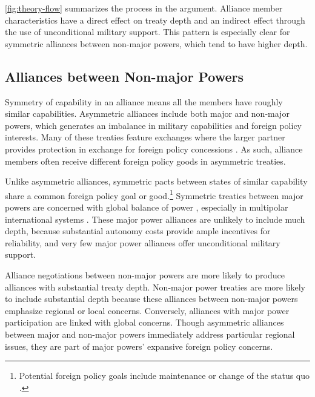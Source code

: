 \documentclass[12pt]{article}
\begin{document}
\autoref{fig:theory-flow} summarizes the process in the argument. 
Alliance member characteristics have a direct effect on treaty depth and an indirect effect through the use of unconditional military support. 
This pattern is especially clear for symmetric alliances between non-major powers, which tend to have higher depth. 


\subsection{Alliances between Non-major Powers}

Symmetry of capability in an alliance means all the members have roughly similar capabilities. 
Asymmetric alliances include both major and non-major powers, which generates an imbalance in military capabilities and foreign policy interests. 
Many of these treaties feature exchanges where the larger partner provides protection in exchange for foreign policy concessions \citep{Morrow1991, Johnson2015}. 
As such, alliance members often receive different foreign policy goods in asymmetric treaties. 


Unlike asymmetric alliances, symmetric pacts between states of similar capability share a common foreign policy goal or good.\footnote{Potential foreign policy goals include maintenance or change of the status quo \citep{MorganPalmer2006}.} 
Symmetric treaties between major powers are concerned with global balance of power \citep{Walt1990}, especially in multipolar international systems \citep{Snyder1984, Snyder1990, ChristensenSnyder1990}. 
These major power alliances are unlikely to include much depth, because substantial autonomy costs provide ample incentives for reliability, and very few major power alliances offer unconditional military support.


Alliance negotiations between non-major powers are more likely to produce alliances with substantial treaty depth. 
Non-major power treaties are more likely to include substantial depth because these alliances between non-major powers emphasize regional or local concerns.
Conversely, alliances with major power participation are linked with global concerns.
Though asymmetric alliances between major and non-major powers immediately address particular regional issues, they are part of major powers' expansive foreign policy concerns.  
\end{document}

